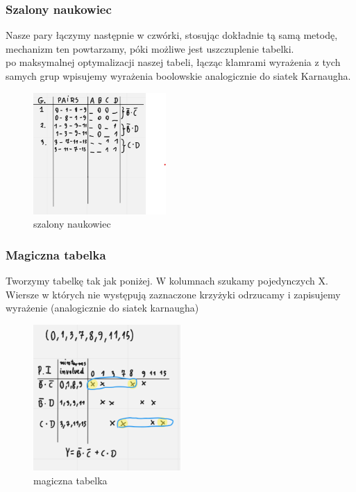 \subsubsection{Szalony naukowiec}

Nasze pary łączymy następnie w czwórki, stosując dokładnie tą samą metodę, mechanizm ten powtarzamy, póki możliwe jest uszczuplenie tabelki.\\ po maksymalnej optymalizacji naszej tabeli, łącząc klamrami wyrażenia z tych samych grup wpisujemy wyrażenia boolowskie analogicznie do siatek Karnaugha.

\begin{figure}[h!]
    \centering
    \includegraphics[width=0.45\textwidth]{images/qmc/qmc_3.png}
    \caption{szalony naukowiec}
    \label{fig:my_label}
\end{figure}

\subsubsection{Magiczna tabelka}

Tworzymy tabelkę tak jak poniżej. W kolumnach szukamy pojedynczych X. Wiersze w których nie występują zaznaczone krzyżyki odrzucamy i zapisujemy wyrażenie (analogicznie do siatek karnaugha)

\begin{figure}[h!]
    \centering
    \includegraphics[width=0.50\textwidth]{images/qmc/qmc_4.png}
    \caption{magiczna tabelka}
    \label{fig:my_label}
\end{figure}

